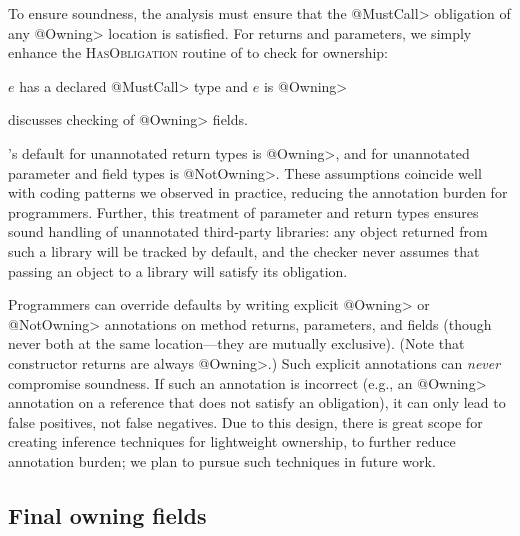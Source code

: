 To ensure soundness, the analysis must ensure that the \<@MustCall> obligation
of any \<@Owning> location is satisfied.  For returns and parameters, we simply
enhance the \textsc{HasObligation} routine of  to check for
ownership:
\begin{algorithmic}
  \State \Return $e$ has a declared \<@MustCall> type and $e$ is \<@Owning>
  \EndProcedure
\end{algorithmic}
 discusses checking of \<@Owning> fields.

\Tool's default for unannotated return types is \<@Owning>,
and for unannotated parameter and field types is \<@NotOwning>.  These assumptions
coincide well with coding patterns we observed in practice, reducing the
annotation burden for programmers.  Further, this treatment of parameter and
return types ensures sound handling of unannotated third-party libraries: any
object returned from such a library will be tracked by default, and the checker
never assumes that passing an object to a library will satisfy its obligation.

Programmers can override defaults by writing explicit \<@Owning> or
\<@NotOwning> annotations on method returns, parameters, and fields (though never both at the same
location---they are mutually exclusive).  (Note that constructor returns are always
\<@Owning>.)  Such explicit annotations can
\emph{never} compromise soundness.  If such an annotation is incorrect (e.g., an
\<@Owning> annotation on a reference that does not satisfy an obligation), it
can only lead to false positives, not false negatives.  Due to this design,
there is great scope for creating inference techniques for lightweight
ownership, to further reduce annotation burden; we plan to pursue such
techniques in future work.


\subsection{Final owning fields}
\label{sec:owning-fields}

